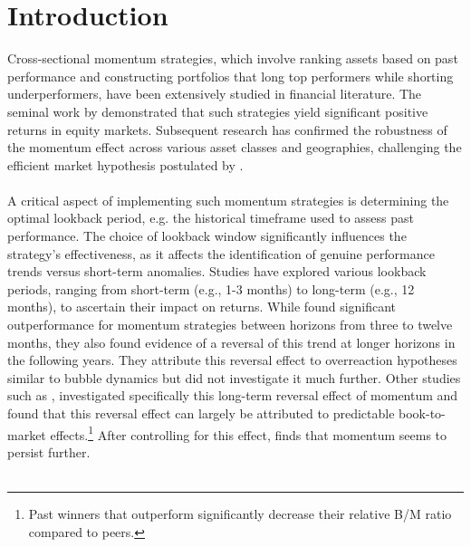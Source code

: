 \documentclass[a4paper,12pt,twoside]{article}
\begin{document}
    \setcounter{page}{1}
	\tableofcontents
	
	\clearpage
	\listoffigures
	
	\listoftables
	
	\clearpage
    \setcounter{page}{1}
    \setlength{\parindent}{0pt}
    \setlength{\parskip}{8pt}

\section{Introduction}
Cross-sectional momentum strategies, which involve ranking assets based on past performance and constructing portfolios that long top performers while shorting underperformers, have been extensively studied in financial literature. The seminal work by \cite{jegadeesh1993returns} demonstrated that such strategies yield significant positive returns in equity markets. Subsequent research has confirmed the robustness of the momentum effect across various asset classes and geographies, challenging the efficient market hypothesis postulated by \cite{fama1970efficient}.
\\~\\
A critical aspect of implementing such momentum strategies is determining the optimal lookback period, e.g. the historical timeframe used to assess past performance. The choice of lookback window significantly influences the strategy's effectiveness, as it affects the identification of genuine performance trends versus short-term anomalies. Studies have explored various lookback periods, ranging from short-term (e.g., 1-3 months) to long-term (e.g., 12 months), to ascertain their impact on returns. While \cite{jegadeesh1993returns} found significant outperformance for momentum strategies between horizons from three to twelve months, they also found evidence of a reversal of this trend at longer horizons in the following years. They attribute this reversal effect to overreaction hypotheses similar to bubble dynamics but did not investigate it much further.
Other studies such as \cite{nagel2001overreaction}, investigated specifically this long-term reversal effect of momentum and found that this reversal effect can largely be attributed to predictable book-to-market effects.\footnote{Past winners that outperform significantly decrease their relative B/M ratio compared to peers.} After controlling for this effect, \cite{nagel2001overreaction} finds that momentum seems to persist further.
\\~\\
\end{document}
